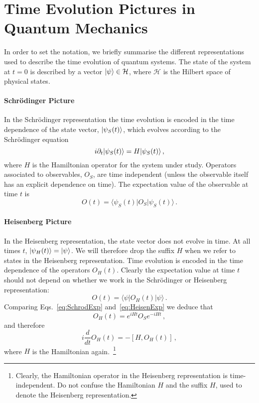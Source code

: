 \newcommand{\Hin}{\mathcal{H}_{\mathrm{in}}}

\section{Time Evolution Pictures in Quantum Mechanics}
\label{sec:reps-quant}

In order to set the notation, we briefly summarise the different representations
used to describe the time evolution of quantum systems. The state of the system
at $t=0$ is described by a vector $| \psi \rangle \in \mathcal{H}$, where
$\mathcal{H}$ is the Hilbert space of physical states.

\paragraph{Schr\"odinger Picture}

In the Schr\"odinger representation the time evolution is encoded in the time
dependence of the state vector, $| \psi_S(t) \rangle$, which evolves according to
the Schr\"odinger equation
\begin{equation}
    \label{eq:SchrodEq}
    i \partial_t | \psi_S(t) \rangle = H | \psi_S(t) \rangle\, ,
\end{equation}
where $H$ is the Hamiltonian operator for the system under study. Operators
associated to observables, $O_S$, are time independent (unless the observable
itself has an explicit dependence on time). The expectation value of the
observable at time $t$ is 
\begin{equation}
    \label{eq:SchrodExp}
    O(t) = \langle \psi_S(t) | O_S | \psi_S(t) \rangle\, .
\end{equation}

\paragraph{Heisenberg Picture}

In the Heisenberg representation, the state vector does not evolve in time. At
all times $t$, $| \psi_H(t) \rangle=| \psi \rangle$. We will therefore drop the suffix
$H$ when we refer to states in the Heisenberg representation. Time evolution is
encoded in the time dependence of the operators $O_H(t)$. Clearly the
expectation value at time $t$ should not depend on whether we work in the
Schr\"odinger or Heisenberg representation:
\begin{equation}
    \label{eq:HeisenExp}
    O(t) = \langle \psi | O_H(t) | \psi \rangle\, .
\end{equation}
Comparing Eqs.~\eqref{eq:SchrodExp} and~\eqref{eq:HeisenExp} we deduce that
\begin{equation}
    \label{eq:HeisenOp}
    O_H(t) = e^{iHt} O_S e^{-iHt}\, ,
\end{equation}
and therefore 
\begin{equation}
    \label{eq:HeisenEvol}
    i \frac{d}{dt} O_H(t) = - \left[H, O_H(t)\right]\, ,
\end{equation}
where $H$ is the Hamiltonian again.~\footnote{Clearly, the Hamiltonian operator
in the Heisenberg representation is time-independent. Do not confuse the
Hamiltonian $H$ and the suffix $H$, used to denote the Heisenberg
representation.}

